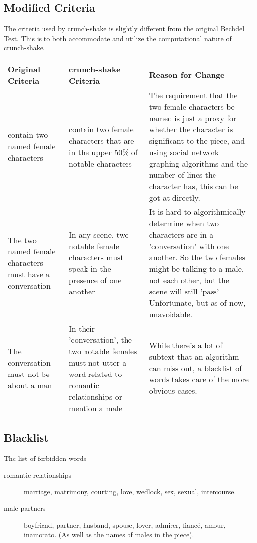 \documentclass[12pt]{article}
\begin{document}
\subsection{Modified Criteria}
\label{sub:crunch_shake_s_new_criteria}
The criteria used by crunch-shake is slightly different from the original
Bechdel Test. This is to both accommodate and utilize the computational nature
of crunch-shake. 
\begin{center}
    \begin{tabularx}{\textwidth}{ | X | X | X |}
    \hline
    Original Criteria & crunch-shake Criteria & Reason for Change \\ \hline
        contain two named female characters & contain two female characters that are
        in the upper 50\% of notable characters & The requirement that the two
        female characters be named is just a proxy for whether the character is
        significant to the piece, and using social network graphing algorithms
        and the number of lines the character has, this can be got at directly.
        \\ \hline
    The two named female characters must have a conversation & In any scene,
        two notable female characters must speak in the presence of one another
        & It is hard to algorithmically determine when two characters are in a
        'conversation' with one another. So the two females might be talking to
        a male, not each other, but the scene will still 'pass'  Unfortunate,
        but as of now, unavoidable.  \\ \hline
    The conversation must not be about a man & In their 'conversation', the two
        notable females must not utter a word related to romantic relationships
        or mention a male & While there's a lot of subtext that an algorithm
        can miss out, a blacklist of words takes care of the more obvious
        cases.   \\
    \hline
    \end{tabularx}
\end{center}

\subsection{Blacklist}
\label{sub:blacklist}

The list of forbidden words 
\begin{description}
    \item[romantic relationships] marriage,
        matrimony, courting, love, wedlock, sex, sexual, intercourse.
    \item[male partners] boyfriend, partner, husband, spouse, lover,
        admirer, fiancé, amour, inamorato. (As well as the names of males in
        the piece).
\end{description}
\end{document}
